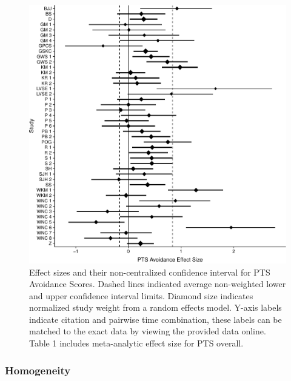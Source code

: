 \documentclass[,man]{apa6}
\begin{document}
\begin{figure}
\centering
\includegraphics{meta_markdown_files/figure-latex/ptspicavoid-1.pdf}
\caption{\label{fig:ptspicavoid}Effect sizes and their non-centralized confidence interval for PTS Avoidance Scores. Dashed lines indicated average non-weighted lower and upper confidence interval limits. Diamond size indicates normalized study weight from a random effects model. Y-axis labels indicate citation and pairwise time combination, these labels can be matched to the exact data by viewing the provided data online. Table 1 includes meta-analytic effect size for PTS overall.}
\end{figure}

\hypertarget{homogeneity}{%
\subsubsection{Homogeneity}\label{homogeneity}}
\end{document}
